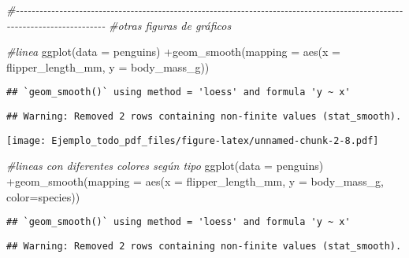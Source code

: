 \documentclass[
]{article}
\newenvironment{Shaded}{\begin{snugshade}}{\end{snugshade}}
\newcommand{\AttributeTok}[1]{\textcolor[rgb]{0.77,0.63,0.00}{#1}}
\newcommand{\CommentTok}[1]{\textcolor[rgb]{0.56,0.35,0.01}{\textit{#1}}}
\newcommand{\FunctionTok}[1]{\textcolor[rgb]{0.00,0.00,0.00}{#1}}
\newcommand{\NormalTok}[1]{#1}
\newcommand{\SpecialCharTok}[1]{\textcolor[rgb]{0.00,0.00,0.00}{#1}}
\begin{document}
\begin{Shaded}
\begin{Highlighting}[]
\CommentTok{\#{-}{-}{-}{-}{-}{-}{-}{-}{-}{-}{-}{-}{-}{-}{-}{-}{-}{-}{-}{-}{-}{-}{-}{-}{-}{-}{-}{-}{-}{-}{-}{-}{-}{-}{-}{-}{-}{-}{-}{-}{-}{-}{-}{-}{-}{-}{-}{-}{-}{-}{-}{-}{-}{-}{-}{-}{-}{-}{-}{-}{-}{-}{-}{-}{-}{-}{-}{-}{-}{-}{-}{-}{-}{-}{-}{-}{-}{-}{-}{-}{-}{-}{-}{-}{-}{-}{-}{-}{-}{-}{-}{-}{-}{-}{-}{-}{-}{-}{-}{-}{-}{-}{-}{-}{-}{-}{-}{-}{-}{-}{-}{-}{-}{-}{-}{-}{-}{-}{-}{-}{-}{-}{-}}
\CommentTok{\#otras figuras de gráficos}


\CommentTok{\#linea}
\FunctionTok{ggplot}\NormalTok{(}\AttributeTok{data =}\NormalTok{ penguins) }\SpecialCharTok{+}\FunctionTok{geom\_smooth}\NormalTok{(}\AttributeTok{mapping =} \FunctionTok{aes}\NormalTok{(}\AttributeTok{x =}\NormalTok{ flipper\_length\_mm, }\AttributeTok{y =}
\NormalTok{                                                    body\_mass\_g))}
\end{Highlighting}
\end{Shaded}

\begin{verbatim}
## `geom_smooth()` using method = 'loess' and formula 'y ~ x'
\end{verbatim}

\begin{verbatim}
## Warning: Removed 2 rows containing non-finite values (stat_smooth).
\end{verbatim}

\texttt{[image: Ejemplo\_todo\_pdf\_files/figure-latex/unnamed-chunk-2-8.pdf]}

\begin{Shaded}
\begin{Highlighting}[]
\CommentTok{\#lineas con diferentes colores según tipo}
\FunctionTok{ggplot}\NormalTok{(}\AttributeTok{data =}\NormalTok{ penguins) }\SpecialCharTok{+}\FunctionTok{geom\_smooth}\NormalTok{(}\AttributeTok{mapping =} \FunctionTok{aes}\NormalTok{(}\AttributeTok{x =}\NormalTok{ flipper\_length\_mm, }\AttributeTok{y =}
\NormalTok{                                                     body\_mass\_g, }\AttributeTok{color=}\NormalTok{species))}
\end{Highlighting}
\end{Shaded}

\begin{verbatim}
## `geom_smooth()` using method = 'loess' and formula 'y ~ x'
\end{verbatim}

\begin{verbatim}
## Warning: Removed 2 rows containing non-finite values (stat_smooth).
\end{verbatim}
\end{document}

